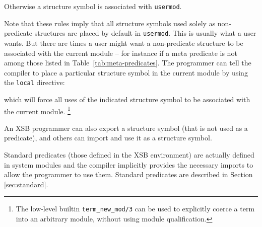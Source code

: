Otherwise a structure symbol is associated with {\tt usermod}.

Note that these rules imply that all structure symbols used solely as
non-predicate structures are placed by default in {\tt usermod}.  This
is usually what a user wants.  But there are times a user might want a
non-predicate structure to be associated with the current module --
for instance if a meta predicate is not among those listed in
Table~\ref{tab:meta-predicates}.  The programmer can tell the
compiler to place a particular structure symbol in the current module
by using the {\tt local} directive:


\noindent which will force all uses of the indicated structure symbol
to be associated with the current module. \footnote{The low-level
  builtin {\tt term\_new\_mod/3} can be used to explicitly coerce a
  term into an arbitrary module, without using module qualification.}


An XSB programmer can also export a structure symbol (that is not used
as a predicate), and others can import and use it as a structure
symbol.

Standard predicates (those defined in the XSB environment) are
actually defined in system modules and the compiler implicitly
provides the necessary imports to allow the programmer to use them.
Standard predicates are described in Section \ref{sec:standard}.

